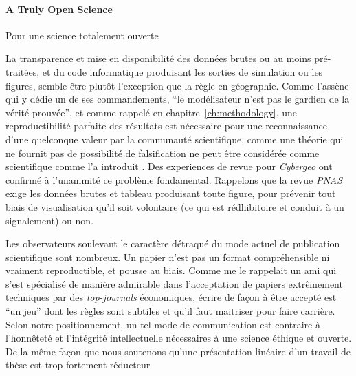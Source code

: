 %



\paragraph{A Truly Open Science}{Pour une science totalement ouverte}



La transparence et mise en disponibilité des données brutes ou au moins pré-traitées, et du code informatique produisant les sorties de simulation ou les figures, semble être plutôt l'exception que la règle en géographie. Comme l'assène  qui y dédie un de ses commandements, ``le modélisateur n'est pas le gardien de la vérité prouvée'', et comme rappelé en chapitre~\ref{ch:methodology}, une reproductibilité parfaite des résultats est nécessaire pour une reconnaissance d'une quelconque valeur par la communauté scientifique, comme une théorie qui ne fournit pas de possibilité de falsification ne peut être considérée comme scientifique comme l'a introduit . Des experiences de revue pour \emph{Cybergeo} ont confirmé à l'unanimité ce problème fondamental. Rappelons que la revue \emph{PNAS} exige les données brutes et tableau produisant toute figure, pour prévenir tout biais de visualisation qu'il soit volontaire (ce qui est rédhibitoire et conduit à un signalement) ou non.



Les observateurs soulevant le caractère détraqué du mode actuel de publication scientifique sont nombreux. Un papier n'est pas un format compréhensible ni vraiment reproductible, et pousse au biais. Comme me le rappelait un ami qui s'est spécialisé de manière admirable dans l'acceptation de papiers extrêmement techniques par des \emph{top-journals} économiques, écrire de façon à être accepté est ``un jeu'' dont les règles sont subtiles et qu'il faut maitriser pour faire carrière. Selon notre positionnement, un tel mode de communication est contraire à l'honnêteté et l'intégrité intellectuelle nécessaires à une science éthique et ouverte. De la même façon que nous soutenons qu'une présentation linéaire d'un travail de thèse est trop fortement réducteur
















